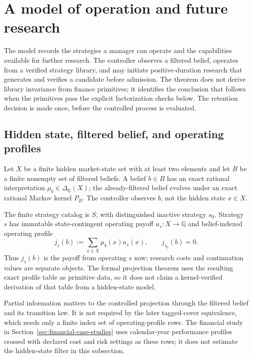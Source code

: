 \section{A model of operation and future research}
\label{sec:model}
\label{sec:model-projection}

The model records the strategies a manager can operate and the capabilities available for further research. The controller observes a filtered belief, operates
from a verified strategy library, and may initiate positive-duration research
that generates and verifies a candidate before admission. The theorem does not
derive library invariance from finance primitives; it identifies the conclusion
that follows when the primitives pass the explicit factorization checks below.
The retention decision is made once, before the controlled process is evaluated.

\subsection{Hidden state, filtered belief, and operating profiles}

Let \(X\) be a finite hidden market-state set with at least two elements and
let \(B\) be a finite nonempty set of filtered beliefs.  A belief
\(b\in B\) has an exact rational interpretation
\(\mu_b\in\Delta_{\mathbb Q}(X)\); the already-filtered belief evolves under
an exact rational Markov kernel \(P_B\).  The controller observes \(b\), not
the hidden state \(x\in X\).

The finite strategy catalog is \(S\), with distinguished inactive strategy
\(s_0\).  Strategy \(s\) has immutable state-contingent operating payoff
\(u_s:X\to\mathbb Q\) and belief-indexed operating profile
\begin{equation}
  j_s(b):=\sum_{x\in X}\mu_b(x)u_s(x),
  \qquad j_{s_0}(b)=0.
  \label{eq:operational-profile}
\end{equation}
Thus \(j_s(b)\) is the payoff from operating \(s\) now; research costs and
continuation values are separate objects.  The formal projection theorem uses
the resulting exact profile table as primitive data, so it does not claim a
kernel-verified derivation of that table from a hidden-state model.

Partial information matters to the controlled projection through the filtered
belief and its transition law. It is not required by the later tagged-cover
equivalence, which needs only a finite index set of operating-profile rows. The
financial study in Section~\ref{sec:financial-case-studies} uses calendar-year
performance profiles crossed with declared cost and risk settings as these
rows; it does not estimate the hidden-state filter in this subsection.

